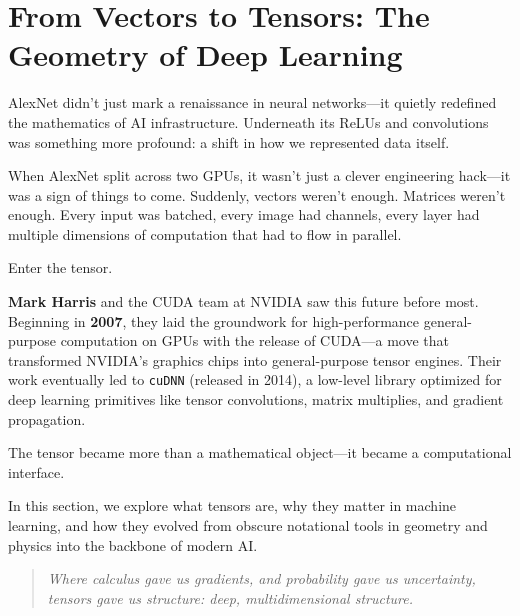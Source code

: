 \section{From Vectors to Tensors: The Geometry of Deep Learning}

AlexNet didn’t just mark a renaissance in neural networks—it quietly redefined the mathematics of AI infrastructure. Underneath its ReLUs and convolutions was something more profound: a shift in how we represented data itself.

When AlexNet split across two GPUs, it wasn't just a clever engineering hack—it was a sign of things to come. Suddenly, vectors weren’t enough. Matrices weren’t enough. Every input was batched, every image had channels, every layer had multiple dimensions of computation that had to flow in parallel.

Enter the tensor.

\textbf{Mark Harris} and the CUDA team at NVIDIA saw this future before most. Beginning in \textbf{2007}, they laid the groundwork for high-performance general-purpose computation on GPUs with the release of CUDA—a move that transformed NVIDIA’s graphics chips into general-purpose tensor engines. Their work eventually led to \texttt{cuDNN} (released in 2014), a low-level library optimized for deep learning primitives like tensor convolutions, matrix multiplies, and gradient propagation.

The tensor became more than a mathematical object—it became a computational interface.

\vspace{1em}

In this section, we explore what tensors are, why they matter in machine learning, and how they evolved from obscure notational tools in geometry and physics into the backbone of modern AI.

\begin{quote}
\emph{Where calculus gave us gradients, and probability gave us uncertainty, tensors gave us structure: deep, multidimensional structure.}
\end{quote}


